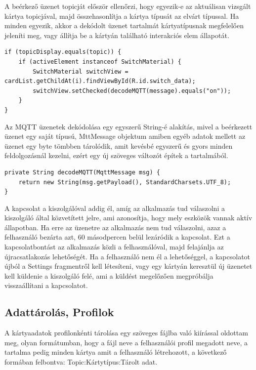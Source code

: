 \documentclass[]{thesis-ekf}
\theoremstyle{definition}
\theoremstyle{remark}
\begin{document}
A beérkező üzenet topicját először ellenőrzi, hogy egyezik-e az aktuálisan vizsgált kártya topicjával, majd
összehasonlítja a kártya típusát az elvárt típussal. Ha minden egyezik, akkor a dekódolt üzenet tartalmát
kártyatípusnak megfelelően jeleníti meg, vagy állítja be a kártyán található interakciós elem állapotát.

\lstset{language=Java}
\begin{lstlisting}[frame=single]
if (topicDisplay.equals(topic)) {
	if (activeElement instanceof SwitchMaterial) {
		SwitchMaterial switchView = cardList.getChildAt(i).findViewById(R.id.switch_data);
		switchView.setChecked(decodeMQTT(message).equals("on"));
	}
}
\end{lstlisting}

Az MQTT üzenetek dekódolása egy egyszerű String-é alakítás, mivel a beérkezett üzenet egy saját típusú, MttMessage
objektum amiben egyéb adatok mellett az üzenet egy byte tömbben tárolódik, amit kevésbé egyszerű és gyors minden
feldolgozásnál kezelni, ezért egy új szöveges változót építek a tartalmából.

\lstset{language=Java}
\begin{lstlisting}[frame=single]
private String decodeMQTT(MqttMessage msg) {
	return new String(msg.getPayload(), StandardCharsets.UTF_8);
}

\end{lstlisting}

A kapcsolat a kiszolgálóval addig él, amíg az alkalmazás tud válaszolni a kiszolgáló által közvetített jelre,
ami azonosítja, hogy mely eszközök vannak aktív állapotban. Ha erre az üzenetre az alkalmazás nem tud válaszolni,
azaz a felhasználó bezárta azt, 60 másodpercen belül lezáródik a kapcsolat. Ezt a kapcsolatbontást az alkalmazás
közli a felhasználóval, majd felajánlja az újracsatlakozás lehetőségét. Ha a felhasználó nem él a lehetőséggel,
a kapcsolatot újból a Settings fragmentről kell létesíteni, vagy egy kártyán keresztül
új üzenetet kell küldenie a kiszolgáló felé, ami a küldést megelőzően megpróbálja visszaállítani a kapcsolatot.

\subsection{Adattárolás, Profilok}
A kártyaadatok profilonkénti tárolása egy szöveges fájlba való kiírással oldottam meg, olyan formátumban, hogy a fájl
neve a felhasználói profil megadott neve, a tartalma pedig minden kártya amit a felhasználó létrehozott, a következő
formában felbontva: Topic:Kártytípus:Tárolt adat.
\end{document}

